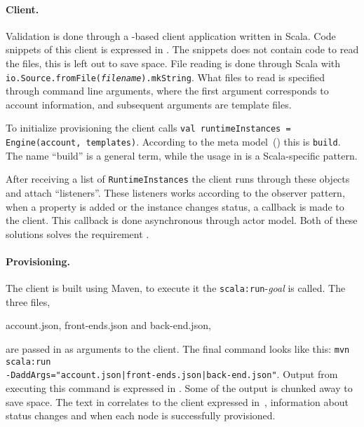 \paragraph{Client.}


Validation is done through a -based client application written in Scala.
Code snippets of this client is expressed in .
The snippets does not contain code to read the files, this is left out to save space.
File reading is done through Scala with \texttt{io.Source.fromFile(\emph{filename}).mkString}.
What files to read is specified through command line arguments,
where the first argument corresponds to account information,
and subsequent arguments are template files.

To initialize provisioning the client calls 
\texttt{val runtimeInstances = Engine(account, templates)}.
According to the meta model~() this is \texttt{build}.
The name ``build'' is a general term, while the usage in 
is a Scala-specific pattern.

After receiving a list of \texttt{RuntimeInstances} the client runs through these 
objects and attach ``listeners''.
These listeners works according to the observer pattern,
when a property is added or the instance changes status,
a callback is made to the client.
This callback is done asynchronous through actor model.
Both of these solutions solves the requirement .

\paragraph{Provisioning.}


The client is built using Maven, to execute it the \texttt{scala:run}-\emph{goal} is called.
The three files,
\begin{ii}
  \iitem account.json,
  \iitem front-ends.json and
  \iitem back-end.json,
\end{ii}
are passed in as arguments to the client.
The final command looks like this:
\texttt{mvn scala:run \\ -DaddArgs="account.json|front-ends.json|back-end.json"}.
Output from executing this command is expressed in .
Some of the output is chunked away to save space.
The text in  correlates to the 
client expressed in~,
\ie information about status changes and when each node is successfully provisioned.

